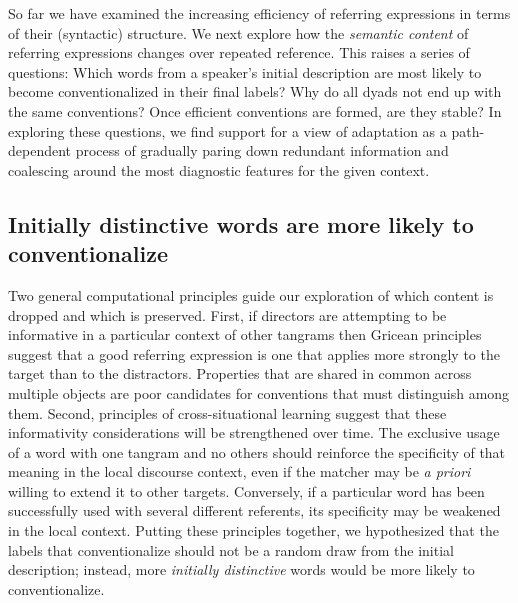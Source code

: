\documentclass[alpha-refs]{wiley-article}
\begin{document}
So far we have examined the increasing efficiency of referring expressions in terms of their (syntactic) structure. 
We next explore how the \emph{semantic content} of referring expressions changes over repeated reference.
This raises a series of questions:
Which words from a speaker's initial description are most likely to become conventionalized in their final labels?
Why do all dyads not end up with the same conventions?
Once efficient conventions are formed, are they stable?
In exploring these questions, we find support for a view of adaptation as a path-dependent process of gradually paring down redundant information and coalescing around the most diagnostic features for the given context.

\subsection{Initially distinctive words are more likely to conventionalize}
\label{sec:distinctive}

Two general computational principles guide our exploration of which content is dropped and which is preserved.
First, if directors are attempting to be informative in a particular context of other tangrams then Gricean principles suggest that a good referring expression is one that applies more strongly to the target than to the distractors. 
Properties that are shared in common across multiple objects are poor candidates for conventions that must distinguish among them.
Second, principles of cross-situational learning suggest that these informativity considerations will be strengthened over time.
The exclusive usage of a word with one tangram and no others should reinforce the specificity of that meaning in the local discourse context, even if the matcher may be \emph{a priori} willing to extend it to other targets.
Conversely, if a particular word has been successfully used with several different referents, its specificity may be weakened in the local context.
Putting these principles together, we hypothesized that the labels that conventionalize should not be a random draw from the initial description; instead, more \emph{initially distinctive} words would be more likely to conventionalize.
\end{document}
